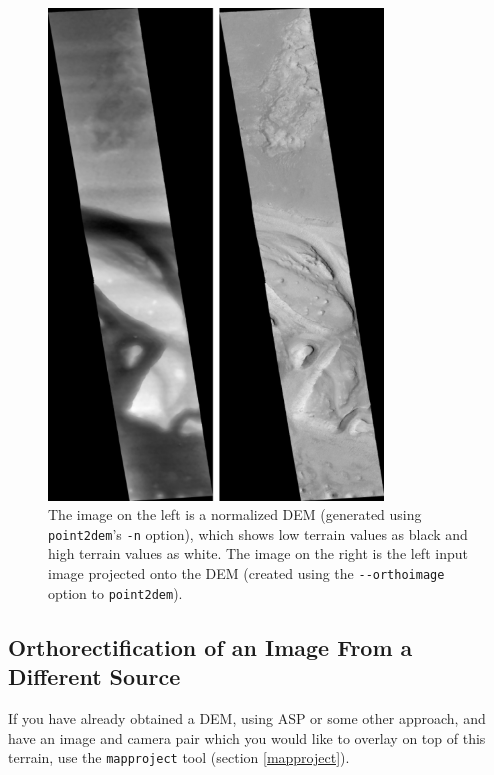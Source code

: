 \begin{figure}
\hfill
\begin{minipage}{3.5in}
\includegraphics[width=3.5in]{images/p19-norm_ortho_500px.png}
\end{minipage}
\hfill
\begin{minipage}{2in}
\caption[P19 Normalized DEM and Orthophoto]{
    \label{p19-norm_ortho}
	The image on the left is a normalized DEM (generated using
        \texttt{point2dem}'s
        \texttt{-n} option), which shows low terrain values as black
        and high terrain values as white.  The image on the right is
        the left input image projected onto the DEM (created using the
        \texttt{-\/-orthoimage} option to \texttt{point2dem}).  }
\end{minipage}
\hfill
\end{figure}

\subsection{Orthorectification of an Image From a Different Source}
If you have already obtained a DEM, using ASP or some other approach, and have
an image and camera pair which you would like to overlay on top of this terrain,
use the \texttt{mapproject} tool (section \ref{mapproject}).


